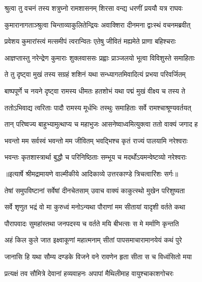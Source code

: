 \twolineshloka
{श्रुत्वा तु वचनं तस्य शत्रुघ्नो रामशासनम्}
{शिरसा वन्द्य धरणीं प्रययौ यत्र राघवः} %

\twolineshloka
{कुमारानागताञ्श्रुत्वा चिन्ताव्याकुलितेन्द्रियः}
{अवाक्शिरा दीनमना द्वाःस्थं वचनमब्रवीत्} %

\twolineshloka
{प्रवेशय कुमारांस्त्वं मत्समीपं त्वरान्वितः}
{एतेषु जीवितं मह्यमेते प्राणा बहिश्चराः} %

\twolineshloka
{आज्ञप्तास्तु नरेन्द्रेण कुमाराः शुक्लवाससः}
{प्रह्वाः प्राञ्जलयो भूत्वा विविशुस्ते समाहिताः} %

\twolineshloka
{ते तु दृष्ट्वा मुखं तस्य सग्रहं शशिनं यथा}
{सन्ध्यागतमिवादित्यं प्रभया परिवर्जितम्} %

\twolineshloka
{बाष्पपूर्णे च नयने दृष्ट्वा रामस्य धीमतः}
{हतशोभं यथा पद्मं मुखं वीक्ष्य च तस्य ते} %

\twolineshloka
{ततोऽभिवाद्य त्वरिताः पादौ रामस्य मूर्धभिः}
{तस्थुः समाहिताः सर्वे रामश्चाश्रूण्यवर्तयत्} %

\twolineshloka
{तान् परिष्वज्य बाहुभ्यामुत्थाप्य च महाभुजः}
{आसनेष्वाध्वमित्युक्त्वा ततो वाक्यं जगाद ह} %

\twolineshloka
{भवन्तो मम सर्वस्वं भवन्तो मम जीवितम्}
{भवद्भिश्च कृतं राज्यं पालयामि नरेश्वराः} %

\twolineshloka
{भवन्तः कृतशास्त्रार्था बुद्धौ च परिनिष्ठिताः}
{सम्भूय च मदर्थोऽयमन्वेष्टव्यो नरेश्वराः} %


{॥इत्यार्षे श्रीमद्रामायणे वाल्मीकीये आदिकाव्ये उत्तरकाण्डे त्रिचत्वारिंशः सर्गः॥}


\twolineshloka
{तेषां समुपविष्टानां सर्वेषां दीनचेतसाम्}
{उवाच वाक्यं काकुत्स्थो मुखेन परिशुष्यता} %

\twolineshloka
{सर्वे शृणुत भद्रं वो मा कुरुध्वं मनोऽन्यथा}
{पौराणां मम सीतायां यादृशी वर्तते कथा} %

\twolineshloka
{पौरापवादः सुमहांस्तथा जनपदस्य च}
{वर्तते मयि बीभत्सः स मे मर्माणि कृन्तति} %

\twolineshloka
{अहं किल कुले जात इक्ष्वाकूणां महात्मनाम्}
{सीतां पापसमाचारामानयेयं कथं पुरे} %

\twolineshloka
{जानासि हि यथा सौम्य दण्डके विजने वने}
{रावणेन हृता सीता स च विध्वंसितो मया} %

\twolineshloka
{प्रत्यक्षं तव सौमित्रे देवानां हव्यवाहनः}
{अपापां मैथिलीमाह वायुश्चाकाशगोचरः} %

